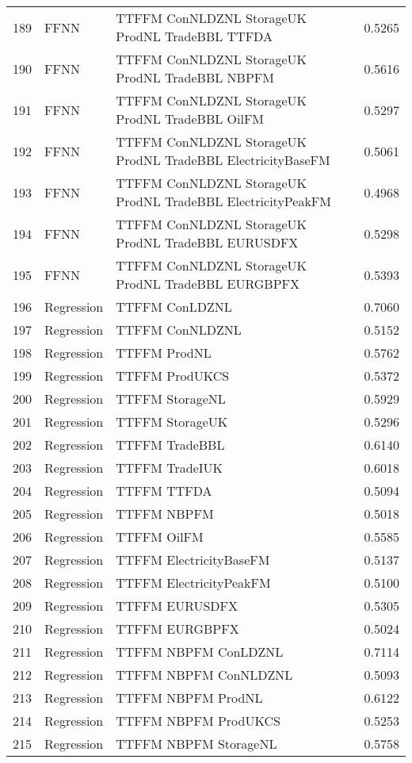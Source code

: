 \begin{table}[ht]
\begin{tabular}{rllr}
  189 & FFNN & TTFFM ConNLDZNL StorageUK ProdNL TradeBBL TTFDA & 0.5265 \\ 
  190 & FFNN & TTFFM ConNLDZNL StorageUK ProdNL TradeBBL NBPFM & 0.5616 \\ 
  191 & FFNN & TTFFM ConNLDZNL StorageUK ProdNL TradeBBL OilFM & 0.5297 \\ 
  192 & FFNN & TTFFM ConNLDZNL StorageUK ProdNL TradeBBL ElectricityBaseFM & 0.5061 \\ 
  193 & FFNN & TTFFM ConNLDZNL StorageUK ProdNL TradeBBL ElectricityPeakFM & 0.4968 \\ 
  194 & FFNN & TTFFM ConNLDZNL StorageUK ProdNL TradeBBL EURUSDFX & 0.5298 \\ 
  195 & FFNN & TTFFM ConNLDZNL StorageUK ProdNL TradeBBL EURGBPFX & 0.5393 \\ 
  196 & Regression & TTFFM ConLDZNL & 0.7060 \\ 
  197 & Regression & TTFFM ConNLDZNL & 0.5152 \\ 
  198 & Regression & TTFFM ProdNL & 0.5762 \\ 
  199 & Regression & TTFFM ProdUKCS & 0.5372 \\ 
  200 & Regression & TTFFM StorageNL & 0.5929 \\ 
  201 & Regression & TTFFM StorageUK & 0.5296 \\ 
  202 & Regression & TTFFM TradeBBL & 0.6140 \\ 
  203 & Regression & TTFFM TradeIUK & 0.6018 \\ 
  204 & Regression & TTFFM TTFDA & 0.5094 \\ 
  205 & Regression & TTFFM NBPFM & 0.5018 \\ 
  206 & Regression & TTFFM OilFM & 0.5585 \\ 
  207 & Regression & TTFFM ElectricityBaseFM & 0.5137 \\ 
  208 & Regression & TTFFM ElectricityPeakFM & 0.5100 \\ 
  209 & Regression & TTFFM EURUSDFX & 0.5305 \\ 
  210 & Regression & TTFFM EURGBPFX & 0.5024 \\ 
  211 & Regression & TTFFM NBPFM ConLDZNL & 0.7114 \\ 
  212 & Regression & TTFFM NBPFM ConNLDZNL & 0.5093 \\ 
  213 & Regression & TTFFM NBPFM ProdNL & 0.6122 \\ 
  214 & Regression & TTFFM NBPFM ProdUKCS & 0.5253 \\ 
  215 & Regression & TTFFM NBPFM StorageNL & 0.5758 \\ 

\end{tabular}
\end{table}
